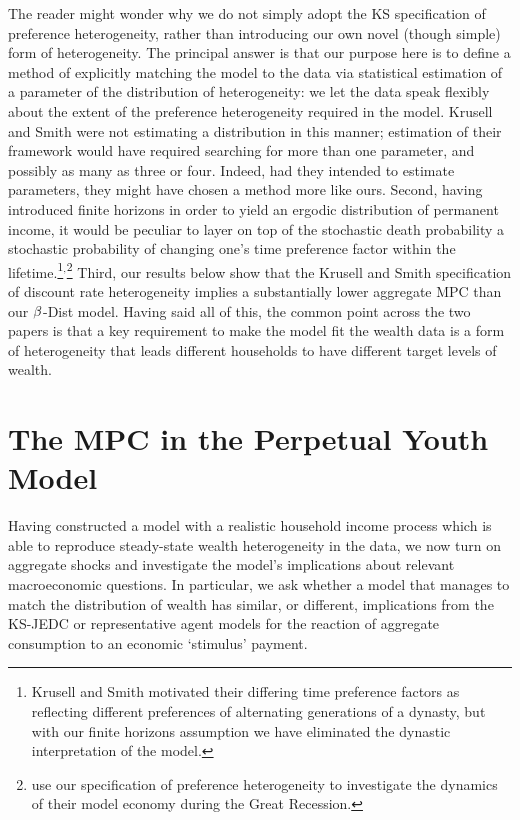 \documentclass[12pt,titlepage]{econtex}
\begin{document}
The reader might wonder why we do not simply adopt the KS
specification of preference heterogeneity, rather than
introducing our own novel (though simple) form of heterogeneity.  The
principal answer is that our purpose here is to define a method of
explicitly matching the model to the data via statistical estimation
of a parameter of the distribution of heterogeneity: we let the data
speak flexibly about the extent of the preference heterogeneity
required in the model.  Krusell and Smith were not estimating
a distribution in this manner; estimation of their framework would have required
searching for more than one parameter, and possibly as many as three or four.  Indeed, had they intended
to estimate parameters, they might have chosen
a method more like ours.  Second, having
introduced finite horizons in order to yield an ergodic distribution
of permanent income, it would be peculiar to layer on top of the
stochastic death probability a stochastic probability of changing
one's time preference factor within the lifetime.\footnote{Krusell and Smith
  motivated their differing time preference factors as reflecting
  different preferences of alternating generations of a dynasty, but
  with our finite horizons assumption we have eliminated the dynastic
  interpretation of the model.}${}^,$\footnote{\cite{kruegerMitmanPerri:handbookMacro} use our specification of preference heterogeneity to investigate the dynamics of their model economy during the Great Recession.}
Third, our results below show that the Krusell and Smith
specification of discount rate heterogeneity implies a substantially lower aggregate MPC than our $\beta$-Dist model.  Having said all of this, the common
point across the two papers is that a key requirement to make the
model fit the wealth data is a form of heterogeneity that leads different
households to have different target levels of wealth.

\section{The MPC in the Perpetual Youth Model} \label{sec:MPC}


Having constructed a model with a realistic household income process which is able to reproduce steady-state wealth heterogeneity in the data, we now turn on aggregate shocks and investigate the model's implications about relevant macroeconomic questions.
In particular, we ask whether a
model that manages to match the distribution of wealth has similar, or
different, implications from the KS-JEDC or representative agent
models for the reaction of aggregate consumption to an economic
`stimulus' payment.
\end{document}
